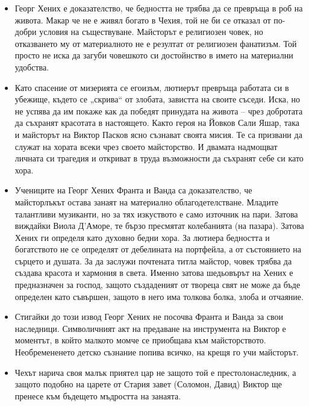 \documentclass[12pt,a4paper]{article}
\begin{document}
\vspace{0.1cm}
\begin{itemize}[leftmargin=*, noitemsep, topsep=2pt, parsep=0pt]
    \item Георг Хених е доказателство, че бедността не трябва да се превръща в роб на живота. Макар че не е живял богато в Чехия, той не би се отказал от по-добри условия на съществуване. Майсторът е религиозен човек, но отказването му от материалното не е резултат от религиозен фанатизъм. Той просто не иска да загуби човешкото си достойнство в името на материални удобства.
    \vspace{0.1cm}
    \item Като спасение от мизерията се егоизъм, лютиерът превръща работата си в убежище, където се „скрива“ от злобата, завистта на своите съседи. Иска, но не успява да им покаже как да победят принудата на живота – чрез добротата да съхранят красотата в настоящето. Както героя на Йовков Сали Яшар, така и майсторът на Виктор Пасков ясно съзнават своята мисия. Те са призвани да служат на хората всеки чрез своето майсторство. И двамата надмощват личната си трагедия и откриват в труда възможности да съхранят себе си като хора.
    \vspace{0.1cm}
    \item Учениците на Георг Хених Франта и Ванда са доказателство, че майсторлъкът остава занаят на материално облагодетелстване. Младите талантливи музиканти, но за тях изкуството е само източник на пари. Затова виждайки Виола Д’Аморе, те бързо пресмятат колебанията (на пазара). Затова Хених ги определя като духовно бедни хора. За лютиера бедността и богатството не се определят от дебелината на портфейла, а от състоянието на сърцето и душата. За да заслужи почтената титла майстор, човек трябва да създава красота и хармония в света. Именно затова шедьовърът на Хених е предназначен за господ, защото създаденият от твореца свят не може да бъде определен като съвършен, защото в него има толкова болка, злоба и отчаяние.
    \vspace{0.1cm}
    \item Стигайки до този извод Георг Хених не посочва Франта и Ванда за свои наследници. Символичният акт на предаване на инструмента на Виктор е моментът, в който малкото момче се приобщава към майсторството. Необремененето детско съзнание попива всичко, на крещя го учи майсторът.
    \vspace{0.1cm}
    \item Чехът нарича своя малък приятел цар не защото той е престолонаследник, а защото подобно на царете от Стария завет (Соломон, Давид) Виктор ще пренесе към бъдещето мъдростта на занаята.

\end{itemize}
\end{document}
